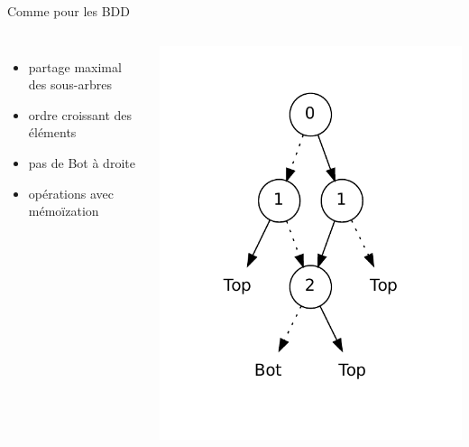 \documentclass{beamer}
\let\emph\alert
\begin{document}
\begin{frame}{Comme pour les BDD}
  \begin{columns}
    \begin{itemize}
    \item partage maximal des sous-arbres
    \item ordre croissant des éléments
    \item pas de \textsf{Bot} à droite

    \bigskip
    \item opérations avec \emph{mémoïzation}
    \end{itemize}

    \includegraphics[scale=0.6]{imports/zdd_construct.pdf}
  \end{columns}
\end{frame}
\end{document}

